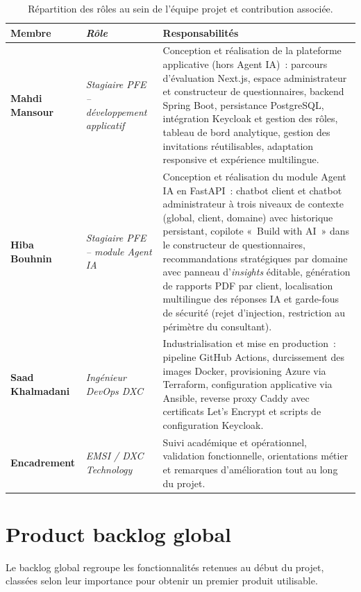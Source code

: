 \documentclass[12pt,a4paper]{report}
\begin{document}
\begin{table}[H]
\centering
\caption{Répartition des rôles au sein de l'équipe projet et contribution associée.}
\begin{tabularx}{\textwidth}{>{\bfseries}L{3.6cm}>{\itshape}L{2.8cm}Y}
\toprule
Membre & Rôle & Responsabilités \\
\midrule
Mahdi Mansour & Stagiaire PFE -- développement applicatif & Conception et réalisation de la plateforme applicative (hors Agent IA)~: parcours d'évaluation Next.js, espace administrateur et constructeur de questionnaires, backend Spring Boot, persistance PostgreSQL, intégration Keycloak et gestion des rôles, tableau de bord analytique, gestion des invitations réutilisables, adaptation responsive et expérience multilingue. \\
Hiba Bouhnin & Stagiaire PFE -- module Agent IA & Conception et réalisation du module Agent IA en FastAPI~: chatbot client et chatbot administrateur à trois niveaux de contexte (global, client, domaine) avec historique persistant, copilote «~Build with AI~» dans le constructeur de questionnaires, recommandations stratégiques par domaine avec panneau d'\textit{insights} éditable, génération de rapports PDF par client, localisation multilingue des réponses IA et garde-fous de sécurité (rejet d'injection, restriction au périmètre du consultant). \\
Saad Khalmadani & Ingénieur DevOps DXC & Industrialisation et mise en production~: pipeline GitHub Actions, durcissement des images Docker, provisioning Azure via Terraform, configuration applicative via Ansible, reverse proxy Caddy avec certificats Let's Encrypt et scripts de configuration Keycloak. \\
Encadrement & EMSI / DXC Technology & Suivi académique et opérationnel, validation fonctionnelle, orientations métier et remarques d'amélioration tout au long du projet. \\
\bottomrule
\end{tabularx}
\label{tab:equipe}
\end{table}

\section{Product backlog global}
Le backlog global regroupe les fonctionnalités retenues au début du projet, classées selon leur importance pour obtenir un premier produit utilisable.
\end{document}
